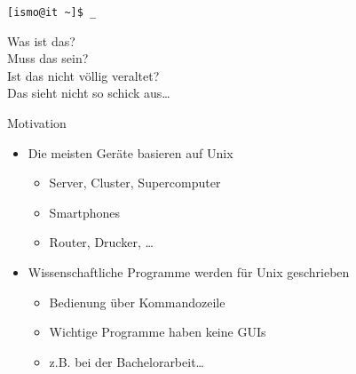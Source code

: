 \tabulinesep=4pt

{
  \color{white}

  \begin{frame}
    \verb+[ismo@it ~]$ _+
\end{frame}
}

\begin{frame}
  \centering
  \Huge
  Was ist das? \\[1em]

  Muss das sein? \\[1em]

  Ist das nicht völlig veraltet? \\[1em]

  Das sieht nicht so schick aus…
\end{frame}

\begin{frame}{Motivation}
  \begin{itemize}
    \item Die meisten Geräte basieren auf Unix
      \begin{itemize}
        \item Server, Cluster, Supercomputer
        \item Smartphones
        \item Router, Drucker, …
      \end{itemize}
    \item Wissenschaftliche Programme werden für Unix geschrieben
      \begin{itemize}
        \item Bedienung über Kommandozeile
        \item Wichtige Programme haben keine GUIs
        \item z.B. bei der Bachelorarbeit…
      \end{itemize}
  \end{itemize}
\end{frame}


